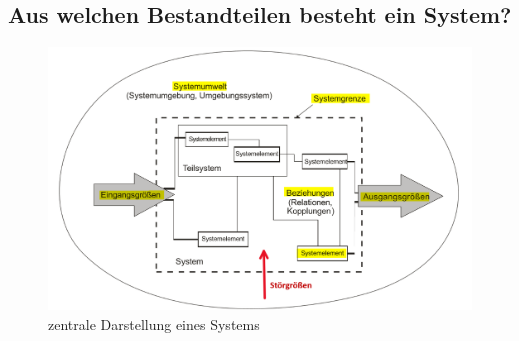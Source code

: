 \subsection{Aus welchen Bestandteilen besteht ein System?}

\begin{figure}[H]
	\centering
	\includegraphics[width=0.7\linewidth]{Bilder/Teil1_zentraleDarstellungSystem.png}
	\caption{zentrale Darstellung eines Systems}
\end{figure}

